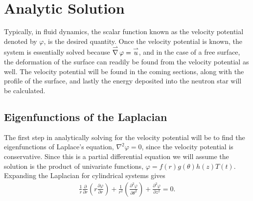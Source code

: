 %
%
%
%
%
%
%
%
%

\chapter{Analytic Solution}

Typically, in fluid dynamics, the scalar function known as the velocity potential denoted by $\varphi$, is the desired quantity. Once the velocity potential is known, the system is essentially solved because  $\operatorname{\overset{\rightharpoonup}\nabla} \varphi = \overset{\rightharpoonup}u$, and in the case of a free surface, the deformation of the surface can readily be found from the velocity potential as well. The velocity potential will be found in the coming sections, along with the profile of the surface, and lastly the energy deposited into the neutron star will be calculated.

\section{Eigenfunctions of the Laplacian}

The first step in analytically solving for the velocity potential will be to find the eigenfunctions of Laplace's equation, $\nabla^2 \varphi = 0$, since the velocity potential is conservative. Since this is a partial differential equation we will assume the solution is the product of univariate functions, $\varphi = f(r) g(\theta) h(z) T(t)$. Expanding the Laplacian for cylindrical systems gives 
\begin{align*}
\frac{1}{r}\frac{\partial}{\partial r} \left( r \frac{\partial \varphi}{\partial r} \right) + \frac{1}{r^2} \left( \frac{\partial^2 \varphi}{\partial \theta^2} \right) + \frac{\partial^2 \varphi}{\partial z^2} = 0.
\end{align*}

